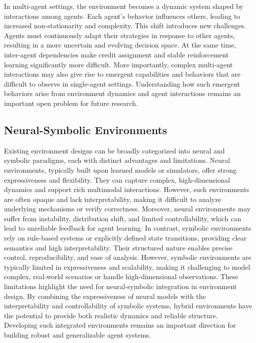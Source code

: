 In multi-agent settings, the environment becomes a dynamic system shaped by interactions among agents. Each agent’s behavior influences others, leading to increased non-stationarity and complexity.
This shift introduces new challenges. Agents must continuously adapt their strategies in response to other agents, resulting in a more uncertain and evolving decision space. At the same time, inter-agent dependencies make credit assignment and stable reinforcement learning significantly more difficult. 
More importantly, complex multi-agent interactions may also give rise to emergent capabilities and behaviors that are difficult to observe in single-agent settings.
Understanding how such emergent behaviors arise from environment dynamics and agent interactions remains an important open problem for future research.




\subsection{Neural-Symbolic Environments}

Existing environment designs can be broadly categorized into neural and symbolic paradigms, each with distinct advantages and limitations.
Neural environments, typically built upon learned models or simulators, offer strong expressiveness and flexibility. They can capture complex, high-dimensional dynamics and support rich multimodal interactions. However, such environments are often opaque and lack interpretability, making it difficult to analyze underlying mechanisms or verify correctness. Moreover, neural environments may suffer from instability, distribution shift, and limited controllability, which can lead to unreliable feedback for agent learning.
In contrast, symbolic environments rely on rule-based systems or explicitly defined state transitions, providing clear semantics and high interpretability. Their structured nature enables precise control, reproducibility, and ease of analysis. However, symbolic environments are typically limited in expressiveness and scalability, making it challenging to model complex, real-world scenarios or handle high-dimensional observations.
These limitations highlight the need for neural-symbolic integration in environment design. By combining the expressiveness of neural models with the interpretability and controllability of symbolic systems, hybrid environments have the potential to provide both realistic dynamics and reliable structure. Developing such integrated environments remains an important direction for building robust and generalizable agent systems.


